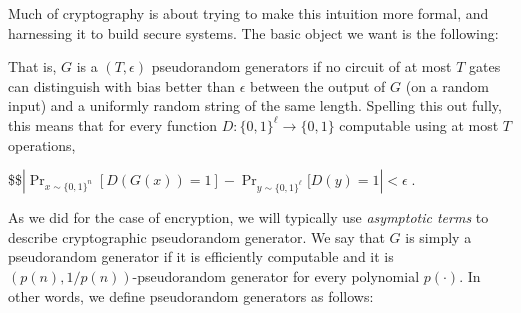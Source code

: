 Much of cryptography is about trying to make this intuition more formal,
and harnessing it to build secure systems. The basic object we want is
the following:

\hypertarget{prgdefconcrete}{}

That is, \(G\) is a \((T,\epsilon)\) pseudorandom generators if no
circuit of at most \(T\) gates can distinguish with bias better than
\(\epsilon\) between the output of \(G\) (on a random input) and a
uniformly random string of the same length. Spelling this out fully,
this means that for every function
\(D:\{0,1\}^\ell \rightarrow \{0,1\}\) computable using at most \(T\)
operations,

\$\$\(\left| \Pr_{x \sim \{0,1\}^n}[ D(G(x))=1 ] - \Pr_{y \sim \{0,1\}^\ell}[ D(y)=1 \right| < \epsilon\;.\)

As we did for the case of encryption, we will typically use
\emph{asymptotic terms} to describe cryptographic pseudorandom
generator. We say that \(G\) is simply a pseudorandom generator if it is
efficiently computable and it is \((p(n),1/p(n))\)-pseudorandom
generator for every polynomial \(p(\cdot)\). In other words, we define
pseudorandom generators as follows:

\hypertarget{prgdef}{}

